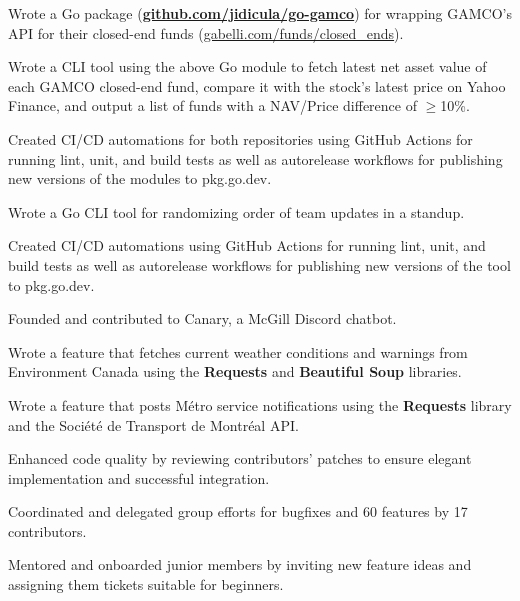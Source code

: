 \documentclass[]{jidicula-resume}
\begin{document}
\begin{tightemize}
\item Wrote a Go package (\href{https://github.com/jidicula/go-gamco}{\bf github.com/jidicula/go-gamco}) for wrapping GAMCO's API for their closed-end funds (\href{https://gabelli.com/funds/closed_ends}{gabelli.com/funds/closed\_ends}).
\item Wrote a CLI tool using the above Go module to fetch latest net asset value of each GAMCO closed-end fund, compare it with the stock's latest price on Yahoo Finance, and output a list of funds with a NAV/Price difference of $\ge$10\%.
\item Created CI/CD automations for both repositories using GitHub Actions for running lint, unit, and build tests as well as autorelease workflows for publishing new versions of the modules to pkg.go.dev.
\end{tightemize}
\sectionsep{}

\begin{tightemize}
\item Wrote a Go CLI tool for randomizing order of team updates in a standup.
\item Created CI/CD automations using GitHub Actions for running lint, unit, and build tests as well as autorelease workflows for publishing new versions of the tool to pkg.go.dev.
\end{tightemize}
\sectionsep{}

\begin{tightemize}
\item Founded and contributed to Canary, a McGill Discord chatbot.
  \item Wrote a feature that fetches current weather conditions and warnings from Environment Canada using the \textbf{Requests} and \textbf{Beautiful Soup} libraries.
  \item Wrote a feature that posts M\'etro service notifications using the \textbf{Requests} library and the Soci\'et\'e de Transport de Montr\'eal API.
  \item Enhanced code quality by reviewing contributors' patches to ensure elegant implementation and successful integration.
  \item Coordinated and delegated group efforts for bugfixes and 60 features by 17 contributors.
  \item Mentored and onboarded junior members by inviting new feature ideas and assigning them tickets suitable for beginners.
\end{tightemize}
\sectionsep{}
\end{document}
